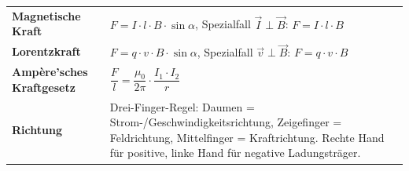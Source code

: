 \documentclass[11pt,a4paper]{exam}
\begin{document}
\begin{formelbox}
\begin{tabularx}{\linewidth}{@{}p{4.6cm}X@{}}
\textbf{Magnetische Kraft} & $F = I\cdot l\cdot B\cdot\sin\alpha$, Spezialfall $\vec I\perp\vec B$: $F=I\cdot l\cdot B$ \\[0.4em]
\textbf{Lorentzkraft} & $F = q\cdot v\cdot B\cdot\sin\alpha$, Spezialfall $\vec v\perp\vec B$: $F=q\cdot v\cdot B$ \\[0.4em]
\textbf{Ampère'sches Kraftgesetz} & $\dfrac{F}{l} = \dfrac{\mu_0}{2\pi}\cdot\dfrac{I_1\cdot I_2}{r}$ \\[0.6em]
\textbf{Richtung} & Drei-Finger-Regel: Daumen = Strom-/Geschwindigkeitsrichtung, Zeigefinger = Feldrichtung, Mittelfinger = Kraftrichtung. Rechte Hand für positive, linke Hand für negative Ladungsträger. \\
\end{tabularx}
\end{formelbox}
\end{document}
